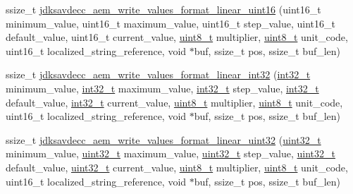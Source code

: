\begin{DoxyCompactItemize}
\item 
ssize\+\_\+t \hyperlink{group__aem__descriptor_ga6881b00ee9de6aa26c46709f19a1eac0}{jdksavdecc\+\_\+aem\+\_\+write\+\_\+values\+\_\+format\+\_\+linear\+\_\+uint16} (uint16\+\_\+t minimum\+\_\+value, uint16\+\_\+t maximum\+\_\+value, uint16\+\_\+t step\+\_\+value, uint16\+\_\+t default\+\_\+value, uint16\+\_\+t current\+\_\+value, \hyperlink{stdint_8h_aba7bc1797add20fe3efdf37ced1182c5}{uint8\+\_\+t} multiplier, \hyperlink{stdint_8h_aba7bc1797add20fe3efdf37ced1182c5}{uint8\+\_\+t} unit\+\_\+code, uint16\+\_\+t localized\+\_\+string\+\_\+reference, void $\ast$buf, ssize\+\_\+t pos, ssize\+\_\+t buf\+\_\+len)
\item 
ssize\+\_\+t \hyperlink{group__aem__descriptor_ga0634ae54ce837152f4a685852c043b90}{jdksavdecc\+\_\+aem\+\_\+write\+\_\+values\+\_\+format\+\_\+linear\+\_\+int32} (\hyperlink{parse_8c_a37994e3b11c72957c6f454c6ec96d43d}{int32\+\_\+t} minimum\+\_\+value, \hyperlink{parse_8c_a37994e3b11c72957c6f454c6ec96d43d}{int32\+\_\+t} maximum\+\_\+value, \hyperlink{parse_8c_a37994e3b11c72957c6f454c6ec96d43d}{int32\+\_\+t} step\+\_\+value, \hyperlink{parse_8c_a37994e3b11c72957c6f454c6ec96d43d}{int32\+\_\+t} default\+\_\+value, \hyperlink{parse_8c_a37994e3b11c72957c6f454c6ec96d43d}{int32\+\_\+t} current\+\_\+value, \hyperlink{stdint_8h_aba7bc1797add20fe3efdf37ced1182c5}{uint8\+\_\+t} multiplier, \hyperlink{stdint_8h_aba7bc1797add20fe3efdf37ced1182c5}{uint8\+\_\+t} unit\+\_\+code, uint16\+\_\+t localized\+\_\+string\+\_\+reference, void $\ast$buf, ssize\+\_\+t pos, ssize\+\_\+t buf\+\_\+len)
\item 
ssize\+\_\+t \hyperlink{group__aem__descriptor_ga2f182306ee3af74d5908dd789785b674}{jdksavdecc\+\_\+aem\+\_\+write\+\_\+values\+\_\+format\+\_\+linear\+\_\+uint32} (\hyperlink{parse_8c_a6eb1e68cc391dd753bc8ce896dbb8315}{uint32\+\_\+t} minimum\+\_\+value, \hyperlink{parse_8c_a6eb1e68cc391dd753bc8ce896dbb8315}{uint32\+\_\+t} maximum\+\_\+value, \hyperlink{parse_8c_a6eb1e68cc391dd753bc8ce896dbb8315}{uint32\+\_\+t} step\+\_\+value, \hyperlink{parse_8c_a6eb1e68cc391dd753bc8ce896dbb8315}{uint32\+\_\+t} default\+\_\+value, \hyperlink{parse_8c_a6eb1e68cc391dd753bc8ce896dbb8315}{uint32\+\_\+t} current\+\_\+value, \hyperlink{stdint_8h_aba7bc1797add20fe3efdf37ced1182c5}{uint8\+\_\+t} multiplier, \hyperlink{stdint_8h_aba7bc1797add20fe3efdf37ced1182c5}{uint8\+\_\+t} unit\+\_\+code, uint16\+\_\+t localized\+\_\+string\+\_\+reference, void $\ast$buf, ssize\+\_\+t pos, ssize\+\_\+t buf\+\_\+len)
\item 

\end{DoxyCompactItemize}
